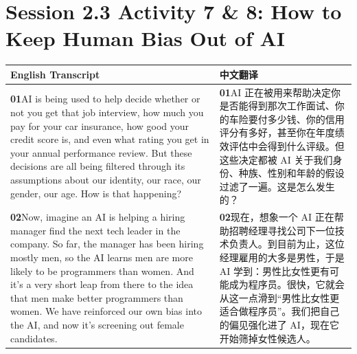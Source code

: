 \documentclass[UTF8,zihao=-4,fontset=fandol]{ctexart}
\newcommand{\TranscriptColumn}{\raggedright\arraybackslash\hyphenpenalty=10000\exhyphenpenalty=10000\sloppy}
\begin{document}
\clearpage
\section{Session 2.3 Activity 7 \& 8: How to Keep Human Bias Out of AI}

\renewcommand{\arraystretch}{1.23}
\begin{longtable}{>{\TranscriptColumn}p{} >{\TranscriptColumn}p{}}
\rowcolor{headerBg}\textbf{English Transcript} & \textbf{中文翻译} \\ \hline
\textbf{01}\quad AI is being used to help decide whether or not you get that job interview, how much you pay for your car insurance, how good your credit score is, and even what rating you get in your annual performance review. But these decisions are all being filtered through its assumptions about our identity, our race, our gender, our age. How is that happening? & \textbf{01}\quad AI 正在被用来帮助决定你是否能得到那次工作面试、你的车险要付多少钱、你的信用评分有多好，甚至你在年度绩效评估中会得到什么评级。但这些决定都被 AI 关于我们身份、种族、性别和年龄的假设过滤了一遍。这是怎么发生的？ \\ \hline
\textbf{02}\quad Now, imagine an AI is helping a hiring manager find the next tech leader in the company. So far, the manager has been hiring mostly men, so the AI learns men are more likely to be programmers than women. And it's a very short leap from there to the idea that men make better programmers than women. We have reinforced our own bias into the AI, and now it's screening out female candidates. & \textbf{02}\quad 现在，想象一个 AI 正在帮助招聘经理寻找公司下一位技术负责人。到目前为止，这位经理雇用的大多是男性，于是 AI 学到：男性比女性更有可能成为程序员。很快，它就会从这一点滑到“男性比女性更适合做程序员”。我们把自己的偏见强化进了 AI，现在它开始筛掉女性候选人。 \\ \hline

\end{longtable}
\end{document}
